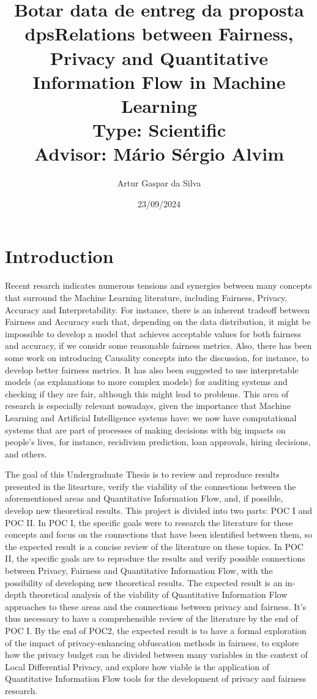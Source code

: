 \documentclass{article}
\title{{\color{red} Botar data de entreg da proposta dps}Relations between Fairness, Privacy and Quantitative Information Flow in Machine Learning\large\\ Type: Scientific\\Advisor: Mário Sérgio Alvim}
\author{Artur Gaspar da Silva}
\date{23/09/2024}
\begin{document}
\maketitle

\section{Introduction}

Recent resarch\cite{Sok}\cite{Reductions}\cite{Rachel}\cite{Awareness} indicates numerous tensions and synergies between many concepts that surround the Machine Learning literature, including Fairness, Privacy, Accuracy and Interpretability. For instance, there is an inherent tradeoff between Fairness and Accuracy such that, depending on the data distribution, it might be impossible to develop a model that achieves acceptable values for both fairness and accuracy, if we considr some reasonable fairness metrics\cite{Carlos}. Also, there has been some work on introducing Causality concepts into the discussion, for instance, to develop better fairness metrics\cite{CausalFair}. It has also been suggested to use interpretable models (as explanations to more complex models) for auditing systems and checking if they are fair, although this might lead to problems\cite{ExplainAll}. This area of research is especially relevant nowadays, given the importance that Machine Learning and Artificial Intelligence systems have: we now have computational systems that are part of processes of making decisions with big impacts on people's lives, for instance, recidivism prediction\cite{Compass}, loan approvals\cite{Loans}, hiring decisions\cite{Jobs}, and others.

The goal of this Undergraduate Thesis is to review and reproduce results presented in the litearture, verify the viability of the connections between the aforementioned areas and Quantitative Information Flow, and, if possible, develop new theoretical results. This project is divided into two parts: POC I and POC II. In POC I, the specific goals were to research the literature for these concepts and focus on the connections that have been identified between them, so the expected result is a concise review of the literature on these topics. In POC II, the specific goals are to reproduce the results and verify possible connections between Privacy, Fairness and Quantitative Information Flow, with the possibility of developing new theoretical results. The expected result is an in-depth theoretical analysis of the viability of Quantitative Information Flow approaches to these areas and the connections between privacy and fairness. It's thus necessary to have a comprehensible review of the literature by the end of POC I. By the end of POC2, the expected result is to have a formal exploration of the impact of privacy-enhancing obfuscation methods in fairness, to explore how the privacy budget can be divided between many variables in the context of Local Differential Privacy, and explore how viable is the application of Quantitative Information Flow tools for the development of privacy and fairness research.
\end{document}
